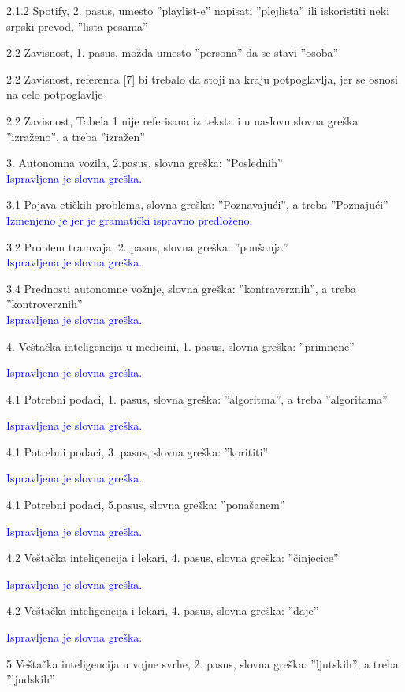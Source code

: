 \documentclass[a4paper]{report}
\newcommand{\odgovor}[1]{\textcolor{blue}{#1}}
\begin{document}
2.1.2 Spotify, 2. pasus, umesto ''playlist-e'' napisati ''plejlista'' ili iskoristiti neki srpski prevod, ''lista pesama''

2.2 Zavisnost, 1. pasus, možda umesto ''persona'' da se stavi ''osoba''

2.2 Zavisnost, referenca [7] bi trebalo da stoji na kraju potpoglavlja, jer se osnosi na celo potpoglavlje

2.2 Zavisnost, Tabela 1 nije referisana iz teksta i u naslovu slovna greška ''izraženo'', a treba ''izražen''

3. Autonomna vozila, 2.pasus, slovna greška: ''Poslednih'' \\
\odgovor{Ispravljena je slovna greška.}

3.1 Pojava etičkih problema, slovna greška: ''Poznavajući'', a treba ''Poznajući'' \\
\odgovor{Izmenjeno je jer je gramatički ispravno predloženo.}

3.2 Problem tramvaja, 2. pasus, slovna greška: ''ponšanja'' \\
\odgovor{Ispravljena je slovna greška.}

3.4 Prednosti autonomne vožnje, slovna greška: ''kontraverznih'', a treba ''kontroverznih'' \\
\odgovor{Ispravljena je slovna greška.}

4. Veštačka inteligencija u medicini, 1. pasus, slovna greška: ''primnene''

\odgovor{Ispravljena je slovna greška.}

4.1 Potrebni podaci, 1. pasus, slovna greška: ''algoritma'', a treba ''algoritama''

\odgovor{Ispravljena je slovna greška.}

4.1 Potrebni podaci, 3. pasus, slovna greška: ''korititi''

\odgovor{Ispravljena je slovna greška.}

4.1 Potrebni podaci, 5.pasus, slovna greška: ''ponašanem''

\odgovor{Ispravljena je slovna greška.}

4.2 Veštačka inteligencija i lekari, 4. pasus, slovna greška: ''činjecice''

\odgovor{Ispravljena je slovna greška.}

4.2 Veštačka inteligencija i lekari, 4. pasus, slovna greška: ''daje''

\odgovor{Ispravljena je slovna greška.}

5 Veštačka inteligencija u vojne svrhe, 2. pasus, slovna greška: ''ljutskih'', a treba ''ljudskih''
\end{document}
